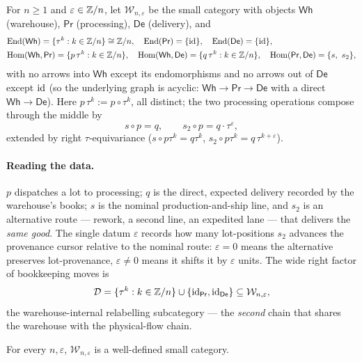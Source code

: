 \begin{definition}
\label{def:supply-Wne}
For $n\ge1$ and $\varepsilon\in\mathbb{Z}/n$, let $\mathcal W_{n,\varepsilon}$ be the
small category with objects $\mathsf{Wh}$ (warehouse), $\mathsf{Pr}$
(processing), $\mathsf{De}$ (delivery), and
\[
\begin{aligned}
&\mathrm{End}(\mathsf{Wh})=\{\tau^k:k\in\mathbb{Z}/n\}\cong\mathbb{Z}/n,\quad
  \mathrm{End}(\mathsf{Pr})=\{\mathrm{id}\},\quad \mathrm{End}(\mathsf{De})=\{\mathrm{id}\},\\
&\mathrm{Hom}(\mathsf{Wh},\mathsf{Pr})=\{p\,\tau^k:k\in\mathbb{Z}/n\},\quad
 \mathrm{Hom}(\mathsf{Wh},\mathsf{De})=\{q\,\tau^k:k\in\mathbb{Z}/n\},\quad
 \mathrm{Hom}(\mathsf{Pr},\mathsf{De})=\{s,\ s_2\},
\end{aligned}
\]
with no arrows into $\mathsf{Wh}$ except its endomorphisms and no arrows out of
$\mathsf{De}$ except $\mathrm{id}$ (so the underlying graph is acyclic:
$\mathsf{Wh}\to\mathsf{Pr}\to\mathsf{De}$ with a direct $\mathsf{Wh}\to\mathsf{De}$).
Here $p\,\tau^k:=p\circ\tau^k$, all distinct; the two processing operations
compose through the middle by
\[
   s\circ p=q,\qquad s_2\circ p=q\cdot\tau^{\varepsilon},
\]
extended by right $\tau$-equivariance ($s\circ p\tau^k=q\tau^k$,
$s_2\circ p\tau^k=q\,\tau^{k+\varepsilon}$).
\end{definition}

\paragraph{Reading the data.} $p$ dispatches a lot to processing; $q$ is the
direct, expected delivery recorded by the warehouse's books; $s$ is the nominal
production-and-ship line, and $s_2$ is an alternative route --- rework, a second
line, an expedited lane --- that delivers the \emph{same good}. The single datum
$\varepsilon$ records how many lot-positions $s_2$ advances the provenance cursor
relative to the nominal route: $\varepsilon=0$ means the alternative preserves
lot-provenance, $\varepsilon\ne0$ means it shifts it by $\varepsilon$ units. The
wide right factor of bookkeeping moves is
\[
   \mathcal{D}=\{\tau^k:k\in\mathbb{Z}/n\}\cup\{\mathrm{id}_{\mathsf{Pr}},\mathrm{id}_{\mathsf{De}}\}
   \subseteq\mathcal W_{n,\varepsilon},
\]
the warehouse-internal relabelling subcategory --- the \emph{second} chain that
shares the warehouse with the physical-flow chain.

\begin{lemma}
\label{lem:supply-cat}
For every $n,\varepsilon$, $\mathcal W_{n,\varepsilon}$ is a well-defined small
category.
\end{lemma}

